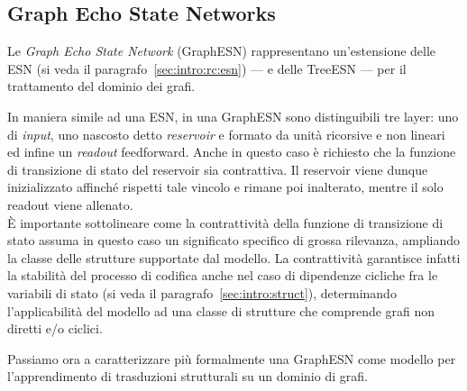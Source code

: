 \subsection{Graph Echo State Networks}\label{sec:intro:struct:gesn}
Le \emph{Graph Echo State Network} (GraphESN) \cite{Gallicchio:GraphESN} rappresentano un'estensione delle ESN (si veda il paragrafo~\ref{sec:intro:rc:esn}) --- e delle TreeESN \cite{Gallicchio:TreeESN} --- per il trattamento del dominio dei grafi.

In maniera simile ad una ESN, in una GraphESN sono distinguibili tre layer: uno di \emph{input}, uno nascosto detto \emph{reservoir} e formato da unità ricorsive e non lineari ed infine un \emph{readout} feedforward. Anche in questo caso è richiesto che la funzione di transizione di stato del reservoir sia contrattiva. Il reservoir viene dunque inizializzato affinché rispetti tale vincolo e rimane poi inalterato, mentre il solo readout viene allenato.\\
\`E importante sottolineare come la contrattività della funzione di transizione di stato assuma in questo caso un significato specifico di grossa rilevanza, ampliando la classe delle strutture supportate dal modello. La contrattività garantisce infatti la stabilità del processo di codifica anche nel caso di dipendenze cicliche fra le variabili di stato (si veda il paragrafo~\ref{sec:intro:struct}), determinando l'applicabilità del modello ad una classe di strutture che comprende grafi non diretti e/o ciclici.

Passiamo ora a caratterizzare più formalmente una GraphESN come modello per l'apprendimento di trasduzioni strutturali su un dominio di grafi.

